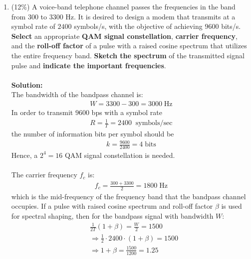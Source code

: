 \documentclass[a4paper,12pt]{article}
\begin{document}
\begin{enumerate}
        \item (12\%)
            A voice-band telephone channel passes the frequencies in the band from $300$ to $3300$ Hz. It is desired to design a modem that transmits at a symbol rate of $2400$ symbols/s, with the objective of achieving $9600$ bits/s. 
            \textbf{Select} an appropriate \textbf{QAM signal constellation}, \textbf{carrier frequency}, and the \textbf{roll-off factor} of a pulse with a raised cosine spectrum that utilizes the entire frequency band. 
            \textbf{Sketch the spectrum} of the transmitted signal pulse and \textbf{indicate the important frequencies}. \\ \\ 
            \textbf{Solution:} \\
            The bandwidth of the bandpass channel is:
            \begin{align*}
                W = 3300 - 300 = 3000 \; \text{Hz}
            \end{align*}
            In order to transmit $9600$ bps with a symbol rate
            \begin{align*}
                R = \frac{1}{T} = 2400 \;\; \text{symbols/sec}
            \end{align*}
            the number of information bits per symbol should be
            \begin{align*}
                k = \frac{9600}{2400} = 4 \; \text{bits}
            \end{align*}
            Hence, a $2^4 = 16$ QAM signal constellation is needed. \\ \\ 
            The carrier frequency $f_c$ is:
            \begin{align*}
                f_c = \frac{300 + 3300}{2} = 1800 \; \text{Hz}
            \end{align*}
            which is the mid-frequency of the frequency band that the bandpass channel occupies. If a pulse with raised cosine spectrum and roll-off factor $\beta$ is used for spectral shaping, then for the bandpass signal with bandwidth $W$:
            \begin{align*}
                & \frac{1}{2T}(1 + \beta) = \frac{W}{2} = 1500 \\
                & \Rightarrow \frac{1}{2} \cdot 2400 \cdot (1 + \beta) = 1500 \\
                & \Rightarrow 1 + \beta = \frac{1500}{1200} = 1.25 \\ 

\end{align*}
\end{enumerate}
\end{document}
